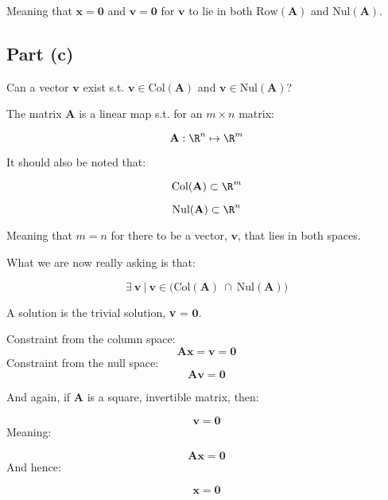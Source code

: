 \documentclass{article}
\begin{document}
Meaning that $\mathbf{x}=\mathbf{0}$ and $\mathbf{v}=\mathbf{0}$ for
$\mathbf{v}$ to lie in both $\text{Row}(\mathbf{A})$ and
$\text{Nul}(\mathbf{A})$.

\subsection{Part (c)} 
Can a vector $\mathbf{v}$ exist s.t. $\mathbf{v} \in \text{Col}(\mathbf{A})$ and
$\mathbf{v} \in \text{Nul}(\mathbf{A})$?

The matrix $\mathbf{A}$ is a linear map s.t. for an $m \times n$ matrix:

\[%
    \mathbf{A}: \R^{n} \mapsto \R^{m} 
\]%

It should also be noted that:

\[%
    \text{Col}(\mathbf{A}) \subset \R^{m}
\]%

\[%
    \text{Nul}(\mathbf{A}) \subset \R^{n}
\]%

Meaning that $m=n$ for there to be a vector, $\mathbf{v}$, that lies in both spaces.

What we are now really asking is that:

\[%
    \exists \ \mathbf{v} \ | \ \mathbf{v} \in 
    \big(  \text{Col}(\mathbf{A}) 
    \ \cap \ 
\text{Nul}(\mathbf{A}) \big)
\]%

A solution is the trivial solution, \textbf{v} = $\mathbf{0}$.

Constraint from the column space:
\[%
    \mathbf{Ax}
    =
    \mathbf{v}
    =
    \mathbf{0}
\]%
Constraint from the null space:
\[%
    \mathbf{Av}
    =
    \mathbf{0}   
\]%

And again, if $\mathbf{A}$ is a square, invertible matrix, then:

\[%
    \mathbf{v}
    =
    \mathbf{0}
\]%
Meaning:

\[%
    \mathbf{Ax}
    =
    \mathbf{0}
\]%
And hence:

\[%
    \mathbf{x}
    =
    \mathbf{0}
\]%
\end{document}
